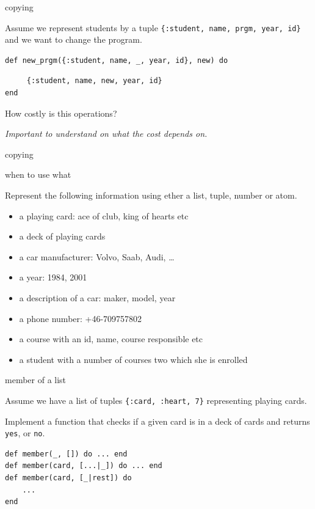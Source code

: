 \begin{frame}[fragile]{copying}

  Assume we represent students by a tuple {\tt \{:student, name, prgm,
    year, id\}} and we want to change the program.

\pause
\begin{verbatim}
def new_prgm({:student, name, _, year, id}, new) do \end{verbatim}\pause\begin{verbatim}
     {:student, name, new, year, id}
end
\end{verbatim}

\pause

How costly is this operations?

\vspace{10pt}
{\em Important to understand on what the cost depends on.}

\end{frame}


\begin{frame}{copying}

\end{frame}

\begin{frame}{when to use what}

Represent the following information using ether a list, tuple, number or atom.
                   
\begin{itemize}
\item a playing card: ace of club, king of hearts etc
\item a deck of playing cards
\item a car manufacturer: Volvo, Saab, Audi, \ldots
\item a year: 1984, 2001
\item a description of a car: maker, model, year
\item a phone number: +46-709757802
\item a course with an id, name, course responsible etc
\item a student with a number of courses two which she is enrolled
\end{itemize}

\end{frame}

\begin{frame}[fragile]{member of a list}

Assume we have a list of tuples {\tt \{:card, :heart, 7\}} representing playing cards. 
\pause

\vspace{10pt}
Implement a function that checks if a given card is in a deck of cards and returns {\tt yes}, or {\tt no}.

\begin{verbatim}
def member(_, []) do ... end
def member(card, [...|_]) do ... end
def member(card, [_|rest]) do 
    ... 
end
\end{verbatim}

\end{frame}

